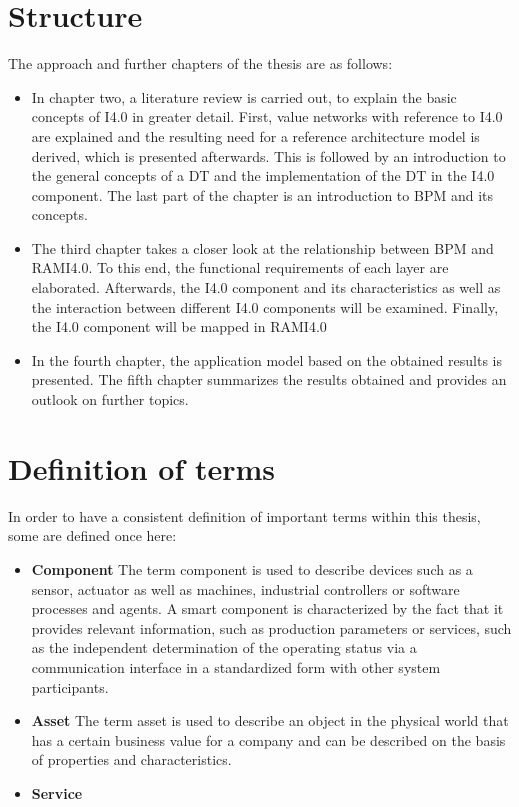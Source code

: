 \section{Structure}
The approach and further chapters of the thesis are as follows:
\begin{itemize}
    \item[] In chapter two, a literature review is carried out, to explain the basic concepts of \ac{I4.0} in greater detail. First, value networks with reference to \ac{I4.0} are explained and the resulting need for a reference architecture model is derived, which is presented afterwards. This is followed by an introduction to the general concepts of a \ac{DT} and the implementation of the \ac{DT} in the \ac{I4.0} component. The last part of the chapter is an introduction to \ac{BPM} and its concepts. 
    
    \item[] The third chapter takes a closer look at the relationship between \ac{BPM} and \ac{RAMI4.0}. To this end, the functional requirements of each layer are elaborated. Afterwards, the \ac{I4.0} component and its characteristics as well as the interaction between different \ac{I4.0} components will be examined. Finally, the \ac{I4.0} component will be mapped in \ac{RAMI4.0}
    
    \item[] In the fourth chapter, the application model based on the obtained results is presented. The fifth chapter summarizes the results obtained and provides an outlook on further topics. 
\end{itemize}


\section{Definition of terms}
In order to have a consistent definition of important terms within this thesis, some are defined once here:
\begin{itemize}
    \item[] \textbf{Component} The term component is used to describe devices such as a sensor, actuator as well as machines, industrial controllers or software processes and agents. A smart component is characterized by the fact that it provides relevant information, such as production parameters or services, such as the independent determination of the operating status via a communication interface in a standardized form with other system participants.
    \item[] \textbf{Asset} The term asset is used to describe an object in the physical world that has a certain business value for a company and can be described on the basis of properties and characteristics.
    \item[] \textbf{Service}
\end{itemize}






